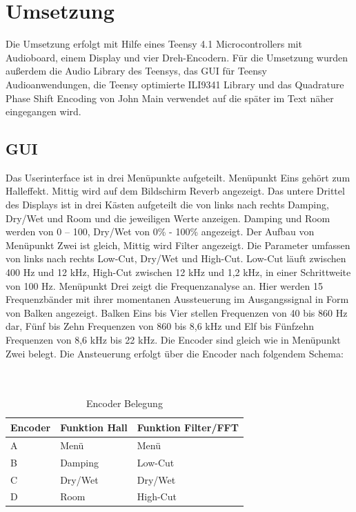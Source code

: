 \documentclass[12pt]{article}
\begin{document}
\section{Umsetzung}
Die Umsetzung erfolgt mit Hilfe eines Teensy 4.1 Microcontrollers mit Audioboard, einem Display und vier Dreh-Encodern.
Für die Umsetzung wurden außerdem die Audio Library des Teensys, das GUI für Teensy Audioanwendungen, die Teensy optimierte ILI9341 Library und das Quadrature Phase Shift Encoding von John Main verwendet auf die später im Text näher eingegangen wird.

\subsection{GUI}
Das Userinterface ist in drei Menüpunkte aufgeteilt. Menüpunkt Eins gehört zum Halleffekt. Mittig wird auf dem Bildschirm \glq Reverb\grq{}\: angezeigt. 
Das untere Drittel des Displays ist in drei Kästen aufgeteilt die von links nach rechts Damping, Dry/Wet und Room und die jeweiligen Werte anzeigen. 
Damping und Room werden von 0 – 100, Dry/Wet von 0\% - 100\% angezeigt. Der Aufbau von Menüpunkt Zwei ist gleich, Mittig wird \glq Filter\grq{}\: angezeigt. 
Die Parameter umfassen von links nach rechts Low-Cut, Dry/Wet und High-Cut. Low-Cut läuft zwischen 400 Hz und 12 kHz, High-Cut zwischen 12 kHz und 1,2 kHz, in einer Schrittweite von 100 Hz. 
Menüpunkt Drei zeigt die Frequenzanalyse an. Hier werden 15 Frequenzbänder mit ihrer momentanen Aussteuerung im Ausgangssignal in Form von Balken angezeigt. Balken Eins bis Vier stellen Frequenzen von 40 bis 860 Hz dar, Fünf bis Zehn Frequenzen von 860 bis 8,6 kHz und Elf bis Fünfzehn Frequenzen von 8,6 kHz bis 22 kHz.
Die Encoder sind gleich wie in Menüpunkt Zwei belegt.
Die Ansteuerung erfolgt über die Encoder nach folgendem Schema:
\\
\\
\\
\begin{table}[h]
    \centering
    \caption{Encoder Belegung}
    \label{tbl:encoderbelegung}
    \begin{tabular}{l|l|l}
      \textbf{Encoder}  & \textbf{Funktion Hall} & \textbf{Funktion Filter/FFT}\\
      \hline
      A & Menü & Menü \\
   
      B & Damping & Low-Cut \\
   
      C & Dry/Wet & Dry/Wet \\
      
      D & Room & High-Cut \\
     

    \end{tabular}    

\end{table}
\end{document}
